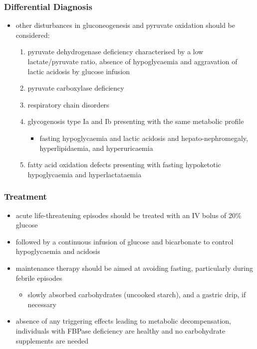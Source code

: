 \documentclass{scrartcl}
\begin{document}
\subsubsection{Differential Diagnosis}
\label{sec:orga833535}
\begin{itemize}
\item other disturbances in gluconeogenesis and pyruvate oxidation should be considered:
\begin{enumerate}
\item pyruvate dehydrogenase deficiency characterised by a low
lactate/pyruvate ratio, absence of hypoglycaemia and aggravation
of lactic acidosis by glucose infusion
\item pyruvate carboxylase deficiency
\item respiratory chain disorders
\item glycogenosis type Ia and Ib presenting with the same metabolic profile
\begin{itemize}
\item fasting hypoglycaemia and lactic acidosis and hepato-nephromegaly, hyperlipidaemia, and hyperuricaemia
\end{itemize}
\item fatty acid oxidation defects presenting with fasting hypoketotic hypoglycaemia and hyperlactataemia
\end{enumerate}
\end{itemize}

\subsubsection{Treatment}
\label{sec:org1299e01}
\begin{itemize}
\item acute life-threatening episodes should be treated with an IV bolus
of 20\% glucose
\item followed by a continuous infusion of glucose and bicarbonate to
control hypoglycaemia and acidosis
\item maintenance therapy should be aimed at avoiding fasting,
particularly during febrile episodes
\begin{itemize}
\item slowly absorbed carbohydrates (uncooked starch), and a gastric
drip, if necessary
\end{itemize}
\item absence of any triggering effects leading to metabolic
decompensation, individuals with FBPase deficiency are healthy and
no carbohydrate supplements are needed
\end{itemize}
\end{document}
